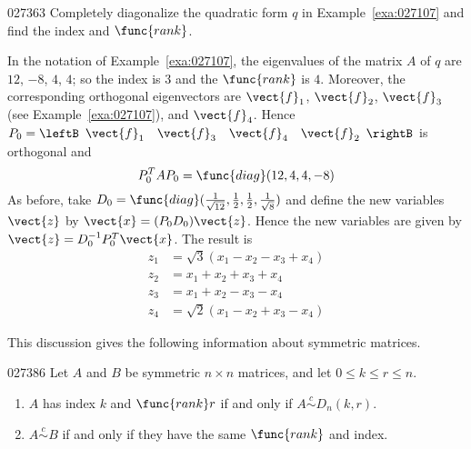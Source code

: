 \begin{example}{}{027363}
Completely diagonalize the quadratic form $q$ in Example~\ref{exa:027107} and find the index and $\func{rank}$.


\begin{solution}
  In the notation of Example~\ref{exa:027107}, the eigenvalues of the matrix $A$ of $q$ are $12$, $-8$, $4$, $4$; so the index is $3$ and the $\func{rank}$ is $4$. Moreover, the corresponding orthogonal eigenvectors are $\vect{f}_{1}$, $\vect{f}_{2}$, $\vect{f}_{3}$ (see Example~\ref{exa:027107}), and $\vect{f}_{4}$. Hence $P_{0} = \leftB \begin{array}{cccc} \vect{f}_{1} & \vect{f}_{3} & \vect{f}_{4} & \vect{f}_{2} \end{array} \rightB$ is orthogonal and
\begin{equation*}
P_{0}^TAP_{0} = \func{diag}(12, 4, 4, -8)
\end{equation*}
As before, take $D_{0} = \func{diag}(\frac{1}{\sqrt{12}}, \frac{1}{2}, \frac{1}{2}, \frac{1}{\sqrt{8}})$ and define the new variables $\vect{z}$ by $\vect{x} = (P_{0}D_{0})\vect{z}$. Hence the new variables are given by $\vect{z} = D_{0}^{-1}P_{0}^T\vect{x}$. The result is
\begin{align*}
z_{1} &= \sqrt{3}(x_{1} - x_{2} - x_{3} + x_{4}) \\
z_{2} &= x_{1} + x_{2} + x_{3} + x_{4} \\
z_{3} &= x_{1} + x_{2} - x_{3} - x_{4} \\
z_{4} &= \sqrt{2}(x_{1} - x_{2} + x_{3} - x_{4}) 
\end{align*}
\end{solution}
\end{example}

This discussion gives the following information about symmetric matrices.


\begin{theorem}{}{027386}
Let $A$ and $B$ be symmetric $n \times n$ matrices, and let $0 \leq k \leq r \leq n$.


\begin{enumerate}
\item $A$ has index $k$ and $\func{rank }r$ if and only if $A \stackrel{c}{\sim} D_{n}(k, r)$.

\item $A \stackrel{c}{\sim} B$ if and only if they have the same $\func{rank}$ and index.

\end{enumerate}
\end{theorem}

